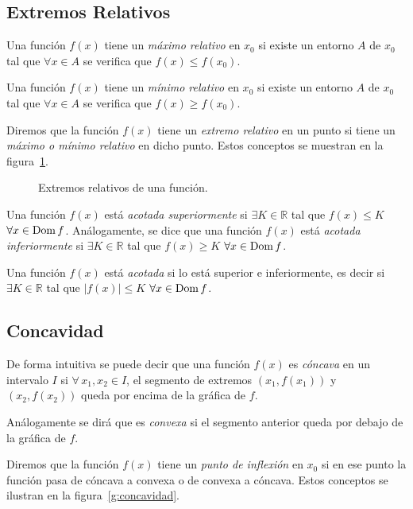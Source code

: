 \subsection{Extremos Relativos}
Una función $f(x)$ tiene un \emph{máximo relativo} en $x_0$ si existe un entorno $A$ de $x_0$ tal que $\forall x \in A$
se verifica que $f(x)\leq f(x_0)$.

Una función $f(x)$ tiene un \emph{mínimo relativo} en $x_0$ si existe un entorno $A$ de $x_0$ tal que $\forall x\in A$
se verifica que $f(x)\geq f(x_0)$.

Diremos que la función $f(x)$ tiene un \emph{extremo relativo} en un punto si tiene un \emph{máximo o mínimo relativo}
en dicho punto. Estos conceptos se muestran en la figura~\ref{g:extremos}.

\begin{figure}[h!]
\centering {}\qquad
{}
\caption{Extremos relativos de una función.}
\label{g:extremos}
\end{figure}

Una función $f(x)$ está \emph{acotada superiormente} si $\exists K\in\mathbb{R}$ tal que $f(x)\leq K$ $\forall x \in \mathop{\rm Dom}\nolimits f$. Análogamente, se dice que una función $f(x)$ está \emph{acotada inferiormente} si $\exists K\in\mathbb{R}$ tal que $f(x)\geq K$ $\forall x \in \mathop{\rm Dom}\nolimits f$.

Una función $f(x)$ está \emph{acotada} si lo está superior e inferiormente, es decir si $\exists K\in\mathbb{R}$ tal que $|f(x)|\leq K$ $\forall x \in \mathop{\rm Dom}\nolimits f$.


\subsection{Concavidad}

De forma intuitiva se puede decir que una función $f(x)$ es \emph{cóncava} en un intervalo $I$ si $\forall\, x_1, x_2
\in I$, el segmento de extremos $(x_1,f(x_1))$ y $(x_2,f(x_2))$ queda por encima de la gráfica de $f$.

Análogamente se dirá que es \emph{convexa} si el segmento anterior queda por debajo de la gráfica de $f$.

Diremos que la función $f(x)$ tiene un \emph{punto de inflexión} en $x_0$ si en ese punto la función pasa de cóncava a
convexa o de convexa a cóncava. Estos conceptos se ilustran en la figura~\ref{g:concavidad}.

